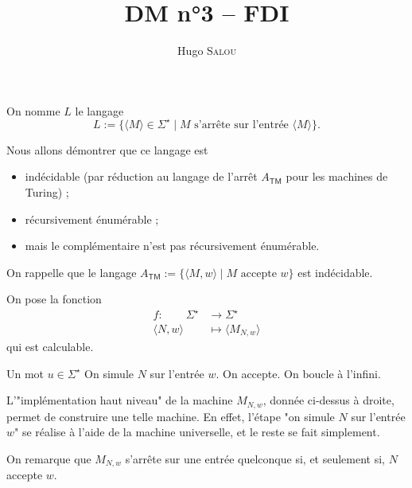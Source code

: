 \documentclass{../../notes}
\title{DM n°3 -- FDI}
\author{Hugo \scshape Salou}
\let\Entree\Require
\begin{document}
  \maketitle

  On nomme $L$ le langage \[
    L := \{\langle M \rangle \in \Sigma^\star  \mid M \text{ s'arrête sur l'entrée } \langle M \rangle \} 
  .\]

  Nous allons démontrer que ce langage est
  \begin{itemize}
    \item indécidable (par réduction au langage de l'arrêt $A_\mathsf{TM}$ pour les machines de Turing) ;
    \item récursivement énumérable ;
    \item mais le complémentaire n'est pas récursivement énumérable.
  \end{itemize}

  On rappelle que le langage $A_\mathsf{TM} := \{\langle M, w \rangle  \mid M \text{ accepte } w\}$ est indécidable.

  \begin{multicols}{2}
    On pose la fonction
    \begin{align*}
      f: \quad\quad \Sigma^\star &\longrightarrow \Sigma^\star \\
      \langle N, w \rangle &\longmapsto \langle M_{N,w} \rangle
    \end{align*}
    qui est calculable.
    \columnbreak
    \begin{mdframed}[linecolor=deepblue,innertopmargin=1em,frametitle={\color{white}Machine $M_{N,w}$},frametitlerule=true,frametitlealignment=\centering,frametitlebackgroundcolor=deepblue]
      \begin{algorithmic}
        \Entree Un mot $u \in \Sigma^\star$
        \State On simule $N$ sur l'entrée $w$.
        \State On accepte.
        \Else
        \State On boucle à l'infini.
        \EndIf
      \end{algorithmic}
    \end{mdframed}
  \end{multicols}

  L'"implémentation haut niveau" de la machine $M_{N,w}$, donnée ci-dessus à droite, permet de construire une telle machine.
  En effet, l'étape "on simule $N$ sur l'entrée $w$" se réalise à l'aide de la machine universelle, et le reste se fait simplement.

  On remarque que $M_{N,w}$ s'arrête sur une entrée quelconque si, et seulement si, $N$ accepte $w$.
\end{document}
